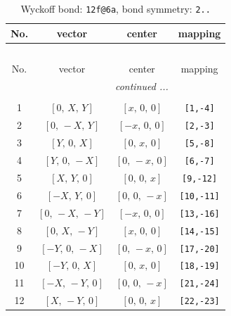 \documentclass[fleqn,8pt]{jsarticle}
\begin{document}
\begin{longtable}{cccc}
\caption{Wyckoff bond: {\tt 12f@6a}, bond symmetry: {\tt 2..}}
 \\
 \hline \hline
No. & vector & center & mapping \\ \hline \endfirsthead

\multicolumn{3}{l}{\tablename\ \thetable{}} \\
 \hline \hline
No. & vector & center & mapping \\ \hline \endhead

 \hline \hline
\multicolumn{3}{r}{\footnotesize\it continued ...} \\ \endfoot

 \hline \hline
\multicolumn{3}{r}{} \\ \endlastfoot

1 & $\left[ 0,\, X,\, Y \right]$ & $\left[ x,\, 0,\, 0 \right]$ & {\tt [1,-4]} \\ \hline
2 & $\left[ 0,\, - X,\, Y \right]$ & $\left[ - x,\, 0,\, 0 \right]$ & {\tt [2,-3]} \\ \hline
3 & $\left[ Y,\, 0,\, X \right]$ & $\left[ 0,\, x,\, 0 \right]$ & {\tt [5,-8]} \\ \hline
4 & $\left[ Y,\, 0,\, - X \right]$ & $\left[ 0,\, - x,\, 0 \right]$ & {\tt [6,-7]} \\ \hline
5 & $\left[ X,\, Y,\, 0 \right]$ & $\left[ 0,\, 0,\, x \right]$ & {\tt [9,-12]} \\ \hline
6 & $\left[ - X,\, Y,\, 0 \right]$ & $\left[ 0,\, 0,\, - x \right]$ & {\tt [10,-11]} \\ \hline
7 & $\left[ 0,\, - X,\, - Y \right]$ & $\left[ - x,\, 0,\, 0 \right]$ & {\tt [13,-16]} \\ \hline
8 & $\left[ 0,\, X,\, - Y \right]$ & $\left[ x,\, 0,\, 0 \right]$ & {\tt [14,-15]} \\ \hline
9 & $\left[ - Y,\, 0,\, - X \right]$ & $\left[ 0,\, - x,\, 0 \right]$ & {\tt [17,-20]} \\ \hline
10 & $\left[ - Y,\, 0,\, X \right]$ & $\left[ 0,\, x,\, 0 \right]$ & {\tt [18,-19]} \\ \hline
11 & $\left[ - X,\, - Y,\, 0 \right]$ & $\left[ 0,\, 0,\, - x \right]$ & {\tt [21,-24]} \\ \hline
12 & $\left[ X,\, - Y,\, 0 \right]$ & $\left[ 0,\, 0,\, x \right]$ & {\tt [22,-23]} \\
\end{longtable}
\renewcommand{\arraystretch}{1.2}
\end{document}
